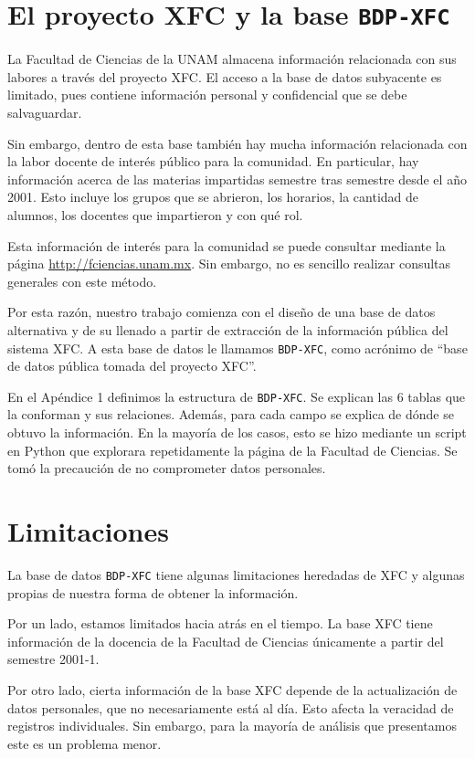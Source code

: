 \documentclass[twocolumn]{article}
\theoremstyle{definition}
\begin{document}
\section{El proyecto XFC y la base \texttt{BDP-XFC}}

La Facultad de Ciencias de la UNAM almacena información relacionada con sus labores a través del proyecto XFC. El acceso a la base de datos subyacente es limitado, pues contiene información personal y confidencial que se debe salvaguardar.

Sin embargo, dentro de esta base también hay mucha información relacionada con la labor docente de interés público para la comunidad. En particular, hay información acerca de las materias impartidas semestre tras semestre desde el año 2001. Esto incluye los grupos que se abrieron, los horarios, la cantidad de alumnos, los docentes que impartieron y con qué rol.

Esta información de interés para la comunidad se puede consultar mediante la página \url{http://fciencias.unam.mx}. Sin embargo, no es sencillo realizar consultas generales con este método.

Por esta razón, nuestro trabajo comienza con el diseño de una base de datos alternativa y de su llenado a partir de extracción de la información pública del sistema XFC. A esta base de datos le llamamos \texttt{BDP-XFC}, como acrónimo de ``base de datos pública tomada del proyecto XFC''.

En el Apéndice 1 definimos la estructura de \texttt{BDP-XFC}. Se explican las $6$ tablas que la conforman y sus relaciones. Además, para cada campo se explica de dónde se obtuvo la información. En la mayoría de los casos, esto se hizo mediante un script en Python que explorara repetidamente la página de la Facultad de Ciencias. Se tomó la precaución de no comprometer datos personales.

\section{Limitaciones}

La base de datos \texttt{BDP-XFC} tiene algunas limitaciones heredadas de XFC y algunas propias de nuestra forma de obtener la información.

Por un lado, estamos limitados hacia atrás en el tiempo. La base XFC tiene información de la docencia de la Facultad de Ciencias únicamente a partir del semestre 2001-1.

Por otro lado, cierta información de la base XFC depende de la actualización de datos personales, que no necesariamente está al día. Esto afecta la veracidad de registros individuales. Sin embargo, para la mayoría de análisis que presentamos este es un problema menor.
\end{document}

